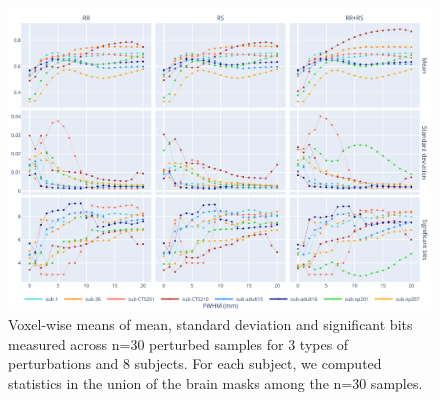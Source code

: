 \documentclass{article}
\begin{document}
\begin{figure}
    \centering
    \includegraphics[width=\linewidth]{figures/stats.pdf}
    \caption{Voxel-wise means of mean, standard deviation and significant bits measured across n=30 perturbed samples for 3 types of perturbations and 8 subjects. For each subject, we computed statistics in the union of the brain masks among the n=30 samples. }
    \label{fig:numerical-uncertainty}
\end{figure}
\end{document}
